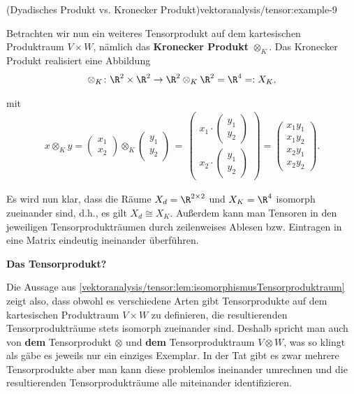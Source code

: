\documentclass[letterpaper,10pt,english]{jupyterBook}
\begin{document}
\begin{example}{(Dyadisches Produkt vs. Kronecker Produkt)}{vektoranalysis/tensor:example-9}
\par
Betrachten wir nun ein weiteres Tensorprodukt auf dem kartesischen Produktraum \(V \times W\), nämlich das \textbf{Kronecker Produkt} \(\otimes_K\).
Das Kronecker Produkt realisiert eine Abbildung
\begin{align*}
\otimes_K \colon \R^2 \times \R^2 \rightarrow \R^2 \otimes_K \R^2 = \R^{4} =: X_K,
\end{align*}
\par
mit
\begin{align*}
x \otimes_K y =
\begin{pmatrix}
x_1 \\ x_2
\end{pmatrix} \otimes_K 
\begin{pmatrix}
y_1 \\ y_2
\end{pmatrix}
\, = \, 
\begin{pmatrix}
x_1 \cdot \begin{pmatrix} y_1 \\ y_2 \end{pmatrix} \\ 
x_2 \cdot \begin{pmatrix} y_1 \\ y_2 \end{pmatrix}
\end{pmatrix}
= 
\begin{pmatrix}
x_1y_1\\
x_1y_2\\
x_2y_1\\
x_2y_2
\end{pmatrix}.
\end{align*}
\par
Es wird nun klar, dass die Räume \(X_d = \R^{2 \times 2}\) und \(X_K = \R^4\) isomorph zueinander sind, d.h., es gilt \(X_d \cong X_K\).
Außerdem kann man Tensoren in den jeweiligen Tensorprodukträumen durch zeilenweises Ablesen bzw. Eintragen in eine Matrix eindeutig ineinander überführen.
\end{example}

\par
\textbf{Das Tensorprodukt?}

\par
Die Aussage aus \cref{vektoranalysis/tensor:lem:isomorphismusTensorproduktraum} zeigt also, dass obwohl es verschiedene Arten gibt Tensorprodukte auf dem kartesischen Produktraum \(V \times W\) zu definieren, die resultierenden Tensorprodukträume stets isomorph zueinander sind.
Deshalb spricht man auch von \textbf{dem} Tensorprodukt \(\otimes\) und \textbf{dem} Tensorproduktraum \(V \otimes W\), was so klingt als gäbe es jeweils nur ein einziges Exemplar.
In der Tat gibt es zwar mehrere Tensorprodukte aber man kann diese problemlos ineinander umrechnen und die resultierenden Tensorprodukträume alle miteinander identifizieren.
\end{document}
